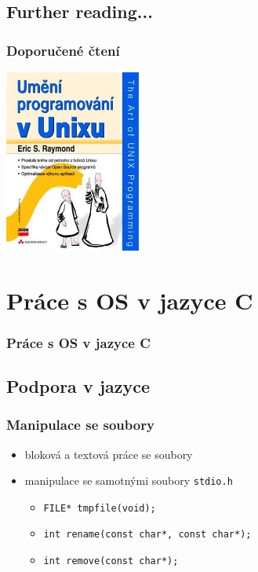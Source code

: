 \subsection{Further reading...}
\begin{frame}
	\frametitle{Doporučené čtení}
		\begin{center}
	\includegraphics[height=60mm]{img/unix-kniha.jpg}
	\end{center}
\end{frame}

\section{Práce s OS v jazyce C}

\begin{frame}
	\frametitle{Práce s OS v jazyce C}
	\tableofcontents[currentsection]
\end{frame}

\subsection{Podpora v jazyce}

\begin{frame}
	\frametitle{Manipulace se soubory}
	\begin{itemize}
		\item{bloková a textová práce se soubory}
		\item{manipulace se samotnými soubory \texttt{stdio.h}}
		\begin{itemize}
			\item{\texttt{FILE* tmpfile(void);}}
			\item{\texttt{int rename(const char*, const char*);}}
			\item{\texttt{int remove(const char*);}}
		\end{itemize}
	\end{itemize}
\end{frame}

